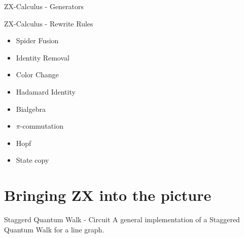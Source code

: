\documentclass{beamer}
\begin{document}
\begin{frame}{ZX-Calculus - Generators}
\end{frame}
\begin{frame}{ZX-Calculus - Rewrite Rules}



	\begin{multicols}{2}
		\begin{itemize}
			\item Spider Fusion
			\item Identity Removal
			\item Color Change
			\item Hadamard Identity
			\item Bialgebra
			\item $\pi$-commutation
			\item Hopf
			\item State copy


		\end{itemize}
	\end{multicols}



\end{frame}
\section{Bringing ZX into the picture}

\begin{frame}{Staggerd Quantum Walk - Circuit}
	A general implementation of a Staggered Quantum Walk for a line graph.


\end{frame}
\end{document}
